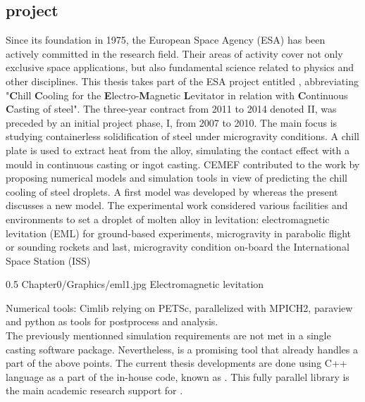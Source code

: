 \subsection*{\ccemlcc project}
Since its foundation in 1975, the European Space Agency (ESA) has been actively committed in the research field.
Their areas of activity cover not only exclusive space applications, but also fundamental science related to 
physics and other disciplines. This thesis takes part of the ESA project entitled \ccemlcc, abbreviating
"\textbf{C}hill \textbf{C}ooling for the \textbf{E}lectro-\textbf{M}agnetic \textbf{L}evitator in relation with 
\textbf{C}ontinuous \textbf{C}asting of steel".
The three-year contract from 2011 to 2014 denoted \ccemlcc II, was preceded by an initial project phase, \ccemlcc I,
from 2007 to 2010. The main focus is studying containerless solidification of steel under microgravity conditions. 
A chill plate is used to extract heat from the alloy, simulating the contact effect with a mould in continuous casting
or ingot casting.
CEMEF contributed to the work by proposing numerical models and simulation tools in view of predicting the chill cooling of steel droplets. 
A first model was developed by \citet{rivaux_simulation_2011} whereas the present discusses a new model. 
The experimental work considered various facilities and environments to set a droplet of molten alloy in levitation: electromagnetic levitation (EML) 
for ground-based experiments, microgravity in parabolic flight or sounding rockets and last, microgravity condition on-board the International Space Station (ISS)

\begin{figureth}
{0.5}
{Chapter0/Graphics/eml1.jpg}
{Electromagnetic levitation}
\label{fig:eml}
\end{figureth}

Numerical tools: Cimlib relying on PETSc, parallelized with MPICH2, paraview and python as tools for postprocess and analysis. \\
The previously mentionned simulation requirements are not met in a single casting software package. Nevertheless, \thercast is a promising tool that already 
handles a part of the above points. The current thesis developments are done using C++ language as a part of the
in-house code, known as \cimlib \citep{digonnet_cimlib:_2007, mesri_advanced_2009}. 
This fully parallel library is the main academic research support for \thercast.\\ \\ 

